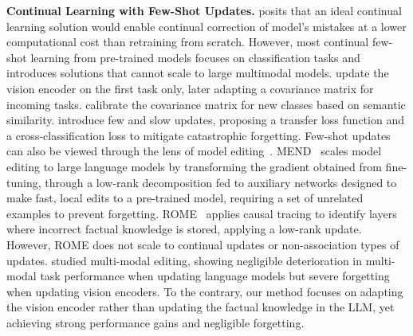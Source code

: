 \textbf{Continual Learning with Few-Shot Updates.} \citet{verwimp2023continual} posits that an ideal continual learning solution would enable continual correction of model's mistakes at a lower computational cost than retraining from scratch. However, most continual few-shot learning from pre-trained models focuses on classification tasks and introduces solutions that cannot scale to large multimodal models. \citet{panos2023first} update the vision encoder on the first task only, later adapting a covariance matrix for incoming tasks. \citet{goswami2024calibrating} calibrate the covariance matrix for new classes based on semantic similarity. \citet{zhao2024safe} introduce few and slow updates, proposing a transfer loss function and a cross-classification loss to mitigate catastrophic forgetting. Few-shot updates can also be viewed through the lens of model editing~\cite{Sinitsin2020Editable}. MEND~\cite{mitchell2022fast} scales model editing to large language models by transforming the gradient obtained from fine-tuning, through a low-rank decomposition fed to auxiliary networks designed to make fast, local edits to a pre-trained model, requiring a set of unrelated examples to prevent forgetting. ROME~\cite{meng2022locating} applies causal tracing to identify layers where incorrect factual knowledge is stored, applying a low-rank update. However, ROME does not scale to continual updates or non-association types of updates. \citet{cheng2024edit} studied multi-modal editing, showing negligible deterioration in multi-modal task performance when updating language models but severe forgetting when updating vision encoders. To the contrary, our method focuses on adapting the vision encoder rather than updating the factual knowledge in the LLM, yet achieving strong performance gains and negligible forgetting.

